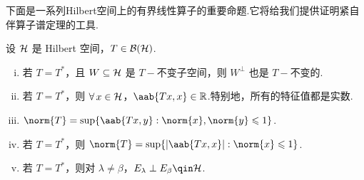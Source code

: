 下面是一系列Hilbert空间上的有界线性算子的重要命题.它将给我们提供证明紧自伴算子谱定理的工具.
\begin{lemma}
设 $\mathcal{H}$ 是 Hilbert 空间，$T\in\mathcal{B}(\mathcal{H})$.
\begin{enumerate}[(i)]
    \item 若 $T=T^*$，且 $W\subseteq\mathcal{H}$ 是 $T-\!\!$不变子空间，则 $W^\perp$ 也是 $T-\!\!$不变的.
    \item 若 $T=T^*$，则 $\forall\,x\in\mathcal{H}$，$\aab{Tx, x}\in\mb{R}$.特别地，所有的特征值都是实数.
    \item $\norm{T} = \sup\{\aab{Tx, y}: \norm{x},\norm{y}\leq 1\}$.
    \item 若 $T=T^*$，则 $\norm{T} = \sup\{|\aab{Tx, x}|: \norm{x}\leq 1\}$.
    \item 若 $T=T^*$，则对 $\lambda\neq\beta$，$E_\lambda\perp E_\beta\qin \mcal{H}$.
\end{enumerate}
\end{lemma}

